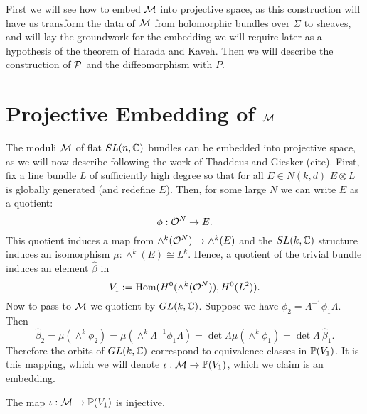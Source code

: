 	First we will see how to embed $\mathcal{M}$ into projective space, as this construction will have us transform the data of $\mathcal{M}$ from holomorphic bundles over $\Sigma$ to sheaves, and will lay the groundwork for the embedding we will require later as a hypothesis of the theorem of Harada and Kaveh. Then we will describe the construction of $\mathcal{P}$ and the diffeomorphism with $P$.
	\section{Projective Embedding of $\mathcal{M}$}
	\label{s:m-embedding}
	The moduli $\mathcal{M}$ of flat $SL(n,\mathbb{C})$ bundles can be embedded into projective space, as we will now describe following the work of Thaddeus and Giesker (cite). First, fix a line bundle $L$ of sufficiently high degree so that for all $E\in N(k,d)$ $E\otimes L$  is globally generated (and redefine $E$). Then, for some large $N$ we can write $E$ as a quotient:
	\begin{equation}
	\phi:\mathcal{O}^N \to E.
	\end{equation}
	This quotient induces a map from $\wedge^k(\mathcal{O}^N) \to \wedge^k(E)$ and the $SL(k,\mathbb{C})$ structure induces an isomorphism $\mu:\wedge^k(E)\cong L^k$. Hence, a quotient of the trivial bundle induces an element $\hat{\beta}$ in 
	\begin{equation}
	V_1 := \text{Hom}(H^0(\wedge^k(\mathcal{O}^N)), H^0(L^2)).
	\end{equation}
	Now to pass to $\mathcal{M}$ we quotient by $GL(k,\mathbb{C})$. Suppose we have $\phi_2 = \Lambda^{-1} \phi_1 \Lambda$. Then
	\begin{equation}
		\hat{\beta}_2 = \mu(\wedge^k \phi_2) = \mu(\wedge^k \Lambda^{-1}\phi_1 \Lambda) = \det\Lambda \mu(\wedge^k \phi_1) = \det\Lambda~ \hat{\beta}_1.
	\end{equation}
	Therefore the orbits of $GL(k,\mathbb{C})$ correspond to equivalence classes in $\mathbb{P}(V_1)$. It is this mapping, which we will denote $\iota:\mathcal{M}\to \mathbb{P}(V_1)$, which we claim is an embedding. 
	\begin{lemma}
		The map $\iota:\mathcal{M} \to \mathbb{P}(V_1)$ is injective.
	\end{lemma}
